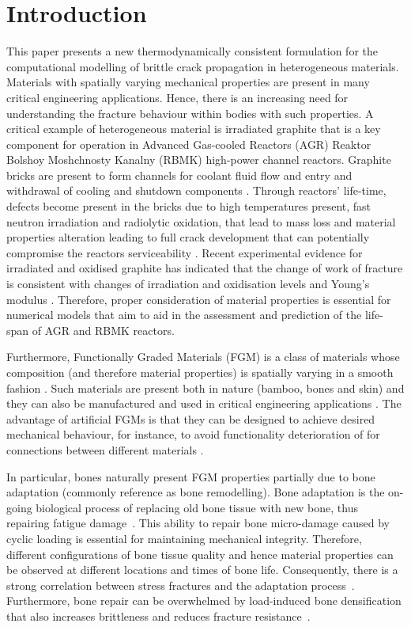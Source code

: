 \documentclass[onecolumn]{svjour3}
\begin{document}

\section{Introduction}
% 
% 
This paper presents a new thermodynamically consistent formulation for the computational modelling of brittle crack propagation in heterogeneous materials. Materials with spatially varying mechanical properties are present in many critical engineering applications. Hence, there is an increasing need for understanding the fracture behaviour within bodies with such properties.
% 
A critical example of heterogeneous material is irradiated graphite that is a key component for operation in Advanced Gas-cooled Reactors (AGR)
Reaktor Bolshoy Moshchnosty Kanalny (RBMK) high-power channel reactors.
Graphite bricks are present to form channels for coolant fluid flow and entry and withdrawal of cooling and shutdown components \cite{Tsang2006, Steer2007}.
Through reactors' life-time, defects become present in the bricks due to high temperatures present, 
fast neutron irradiation and radiolytic oxidation, that lead to mass loss and material properties alteration leading to full crack development that can potentially compromise the reactors serviceability \cite{BrockLehurst1970, Babout2005, McNally2017}.
Recent experimental evidence for irradiated and oxidised graphite has indicated that the change of work of fracture is consistent with changes of irradiation and oxidisation levels and Young's modulus \cite{Tzelepi2018}.
Therefore, proper consideration of material properties is essential for numerical models that aim
to aid in the assessment and prediction of the life-span of AGR and RBMK reactors.

Furthermore, Functionally Graded Materials (FGM) is a class of materials whose composition (and therefore material properties) is spatially varying in a smooth fashion \cite{KawasakiWatanabe1997}.
Such materials are present both in nature (bamboo, bones and skin) and they can also be manufactured and used in critical engineering applications \cite{Jha2013, NaebeShirvan2016}.
The advantage of artificial FGMs is that they can be designed to achieve desired mechanical behaviour, for instance, to avoid functionality deterioration of for connections between different materials \cite{Erdogan1995, FinotSuresh1996}. 

In particular, bones naturally present FGM properties partially due to bone adaptation (commonly reference as bone remodelling).
Bone adaptation is the on-going biological process of replacing old bone tissue with new bone, thus repairing fatigue damage~\cite{hughes2017role}.
This ability to repair bone micro-damage caused by cyclic loading is essential for maintaining mechanical integrity. 
Therefore, different configurations of bone tissue quality and hence material properties can be observed at different locations and times of bone life. 
Consequently, there is a strong correlation between stress fractures and the adaptation process~\cite{hughes2017role}. 
Furthermore, bone repair can be overwhelmed by load-induced bone densification that also increases brittleness and reduces fracture resistance~\cite{loughridge2017qualitative}.
\end{document}
